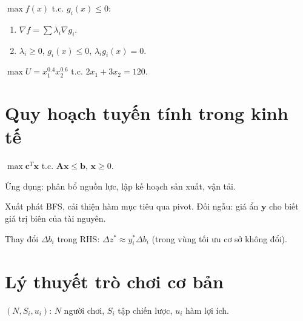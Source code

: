 \documentclass[12pt,a4paper]{article}
\begin{document}
\begin{dinhly}[title={Điều kiện KKT (ràng buộc bất đẳng thức)}]
  $\max f(x)$ t.c. $g_i(x) \le 0$:
  \begin{enumerate}
    \item $\nabla f = \sum \lambda_i \nabla g_i$.
    \item $\lambda_i \ge 0$, $g_i(x) \le 0$, $\lambda_i g_i(x) = 0$.
  \end{enumerate}
\end{dinhly}

\begin{vidu}[title={Tối đa tiện ích}]
  $\max U = x_1^{0.4}x_2^{0.6}$ t.c. $2x_1 + 3x_2 = 120$.
\end{vidu}

\section{Quy hoạch tuyến tính trong kinh tế}

\begin{dinhnghia}[title={Dạng chuẩn}]
  $\max \mathbf{c}^T\mathbf{x}$ t.c. $\mathbf{A}\mathbf{x} \le \mathbf{b}$, $\mathbf{x} \ge 0$.

  Ứng dụng: phân bổ nguồn lực, lập kế hoạch sản xuất, vận tải.
\end{dinhnghia}

\begin{phuongphap}[title={Phương pháp đơn hình}]
  Xuất phát BFS, cải thiện hàm mục tiêu qua pivot. Đối ngẫu: giá ẩn $\mathbf{y}$ cho biết giá trị biên của tài nguyên.
\end{phuongphap}

\begin{dinhly}[title={Phân tích độ nhạy}]
  Thay đổi $\Delta b_i$ trong RHS: $\Delta z^* \approx y_i^* \Delta b_i$ (trong vùng tối ưu cơ sở không đổi).
\end{dinhly}

\section{Lý thuyết trò chơi cơ bản}

\begin{dinhnghia}[title={Trò chơi dạng chuẩn tắc}]
  $(N, S_i, u_i)$: $N$ người chơi, $S_i$ tập chiến lược, $u_i$ hàm lợi ích.
\end{dinhnghia}
\end{document}
